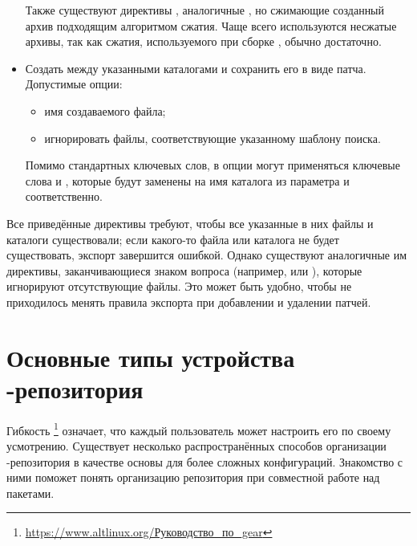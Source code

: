 \begin{itemize}
	Также существуют директивы , аналогичные , но сжимающие созданный архив подходящим алгоритмом сжатия. Чаще всего используются несжатые архивы, так как сжатия, используемого при сборке , обычно достаточно.
	
	\item  \textbf{}
	
	Создать  между указанными каталогами и сохранить его в виде патча. Допустимые опции:
	\begin{itemize}
		\item {} имя создаваемого файла;
		\item {} игнорировать файлы, соответствующие указанному шаблону поиска.
	\end{itemize}
	
	Помимо стандартных ключевых слов, в опции  могут применяться ключевые слова  и , которые будут заменены на имя каталога из параметра  и  соответственно. 
\end{itemize}

Все приведённые директивы требуют, чтобы все указанные в них файлы и каталоги существовали; если какого-то файла или каталога не будет существовать, экспорт завершится ошибкой. Однако существуют аналогичные им директивы, заканчивающиеся знаком вопроса (например,  или ), которые игнорируют отсутствующие файлы. Это может быть удобно, чтобы не приходилось менять правила экспорта при добавлении и удалении патчей.


\section{Основные типы устройства -репозитория}
Гибкость \footnote{\href{https://www.altlinux.org/\%D0\%A0\%D1\%83\%D0\%BA\%D0\%BE\%D0\%B2\%D0\%BE\%D0\%B4\%D1\%81\%D1\%82\%D0\%B2\%D0\%BE_\%D0\%BF\%D0\%BE_gear}{https://www.altlinux.org/Руководство\_по\_gear}} означает, что каждый пользователь может настроить его по своему усмотрению. Существует несколько распространённых способов организации -репозитория в качестве основы для более сложных конфигураций. Знакомство с ними поможет понять организацию репозитория при совместной работе над пакетами. 

